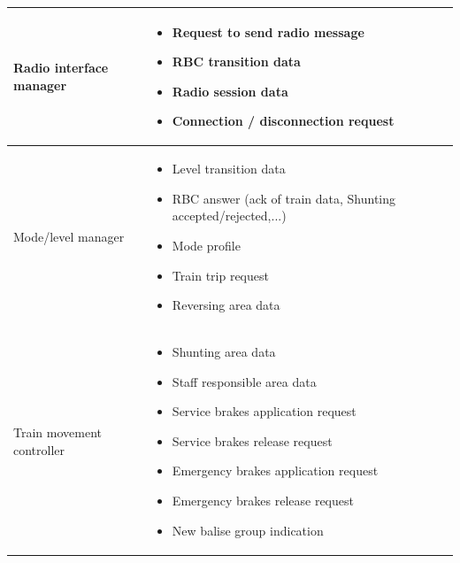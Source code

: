 \documentclass[nocc]{template/openetcs_report}
\begin{document}
\begin{longtable}{|l|l|}
				\hline
					
					\begin{minipage}[t]{0.35\linewidth} Radio interface manager	\end{minipage} 
				&	\begin{minipage}[t]{0.65\linewidth}
						\begin{itemize}
							\item Request to send radio message
							\item RBC transition data
							\item Radio session data
							\item Connection / disconnection request
						\end{itemize}			
					\end{minipage} \\
				
				\hline
									
					\begin{minipage}[t]{0.35\linewidth} Mode/level manager	\end{minipage} 
				&	\begin{minipage}[t]{0.65\linewidth}
						\begin{itemize}
							\item Level transition data
							\item RBC answer (ack of train data, Shunting accepted/rejected,...)
							\item Mode profile
							\item Train trip request
							\item Reversing area data
						\end{itemize}			
					\end{minipage} \\
				
				\hline
													
					\begin{minipage}[t]{0.35\linewidth} Train movement controller	\end{minipage} 
				&	\begin{minipage}[t]{0.65\linewidth}
						\begin{itemize}
							\item Shunting area data
							\item Staff responsible area data
							\item Service brakes application request
							\item Service brakes release request
							\item Emergency brakes application request
							\item Emergency brakes release request
							\item New balise group indication
						\end{itemize}			
					\end{minipage} \\
				

\end{longtable}
\end{document}
